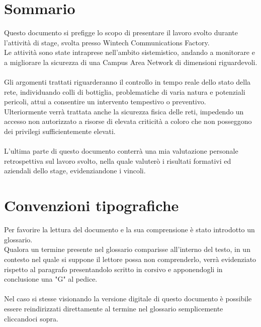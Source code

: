 \documentclass[Tesi.tex]{subfiles}
\begin{document}
\clearpage\thispagestyle{empty}
	
\renewcommand{\chaptername}{}
\renewcommand{\thechapter}{}
\chapter{Sommario}
Questo documento si prefigge lo scopo di presentare il lavoro svolto durante l'attività di stage, svolta presso Wintech Communications Factory. \\
Le attività sono state intraprese nell'ambito sistemistico, andando a monitorare e a migliorare la sicurezza di una Campus Area Network di dimensioni riguardevoli. \\\\

Gli argomenti trattati riguarderanno il controllo in tempo reale dello stato della rete, individuando colli di bottiglia, problematiche di varia natura e potenziali pericoli, attui a consentire un intervento tempestivo o preventivo.\\
Ulteriormente verrà trattata anche la sicurezza fisica delle reti, impedendo un accesso non autorizzato a risorse di elevata criticità a coloro che non posseggono dei privilegi sufficientemente elevati. \\\\

L'ultima parte di questo documento conterrà una mia valutazione personale retrospettiva sul lavoro svolto, nella quale valuterò i risultati formativi ed aziendali dello stage, evidenziandone i vincoli. \\

\newpage
\chapter{Convenzioni tipografiche}
Per favorire la lettura del documento e la sua comprensione è stato introdotto un glossario. \\
Qualora un termine presente nel glossario comparisse all'interno del testo, in un contesto nel quale si suppone il lettore possa non comprenderlo, verrà evidenziato rispetto al paragrafo presentandolo scritto in corsivo e apponendogli in conclusione una "G" al pedice. \\\\
Nel caso si stesse visionando la versione digitale di questo documento è possibile essere reindirizzati direttamente al termine nel glossario semplicemente cliccandoci sopra. \\


\clearpage
\end{document}
